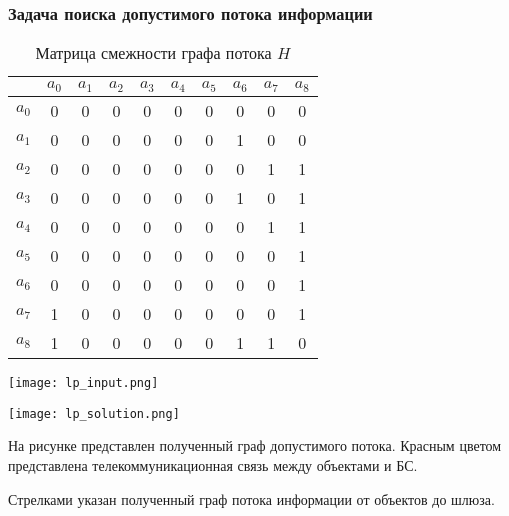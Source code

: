 \begin{frame}
    \frametitle{Задача поиска допустимого потока информации}
    \fontsize{7pt}{5.2}\selectfont
    \justifying
    \begin{table}[h!]\centering
            
        \begin{tabular}{|c|| c| c c c c c| c c c|}\hline
            
            & $a_0$& $a_1$& $a_2$& $a_3$& $a_4$& $a_5$& $a_6$& $a_7$ & $a_8$\\
            \hline
            \hline
            $a_0$ & 0&	0&	0&	0&	0&	0&	0 &	0&	0\\
            \hline
            $a_1$ & 0&	0&	0&	0&	0&	0&	1 &	0&	0\\
            $a_2$ & 0&	0&	0&	0&	0&	0&	0 &	1&	1\\
            $a_3$ & 0&	0&	0&	0&	0&	0&	1 &	0&	1\\
            $a_4$ & 0&	0&	0&	0&	0&	0&	0 &	1&	1\\
            $a_5$ & 0&	0&	0&	0&	0&	0&	0 &	0&	1\\
            \hline
            $a_6$ & 0&	0&	0&	0&	0&	0&	0 &	0&	1\\
            $a_7$ & 1&	0&	0&	0&	0&	0&	0 &	0&	1\\
            $a_8$ & 1&	0&	0&	0&	0&	0&	1 &	1&	0\\
            \hline
        \end{tabular}\caption{Матрица смежности графа потока $H$}\label{tab:part3_lp_adj_mat}
    \end{table}
        
    \begin{minipage}[b]{0.5\linewidth}
        \texttt{[image: lp\_input.png]}


    \end{minipage}     
    \hfill
    \begin{minipage}[b]{0.5\linewidth}
        \centering
        \texttt{[image: lp\_solution.png]}
    \end{minipage}

    На рисунке представлен полученный граф допустимого потока. Красным цветом представлена телекоммуникационная связь между объектами и БС. 

    Стрелками указан полученный граф потока информации от объектов до шлюза. 
\end{frame}

